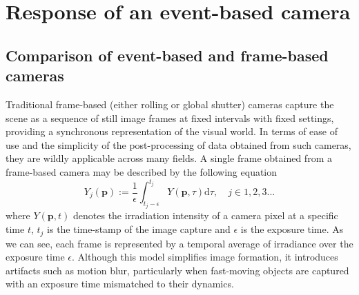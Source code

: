 
\chapter{Response of an event-based camera\label{chap:response}}

\section{Comparison of event-based and frame-based cameras}

Traditional frame-based (either rolling or global shutter) cameras capture the scene as a sequence of still image frames at fixed intervals with fixed settings, providing a synchronous representation of the visual world. 
In terms of ease of use and the simplicity of the post-processing of data obtained from such cameras, they are wildly applicable across many fields.
A single frame obtained from a frame-based camera may be described by the following equation ~\cite{scheerlinck2018event}
\begin{equation}
Y_j(\boldsymbol{p}) := \frac{1}{\epsilon} \int_{t_j - \epsilon}^{t_j} Y(\boldsymbol{p}, \tau) \mathrm{d} \tau, \quad j \in 1, 2, 3 ...
\label{eq:frame}
\end{equation}
where $Y(\boldsymbol{p}, t)$ denotes the irradiation intensity of a camera pixel at a specific time $t$, $t_j$ is the time-stamp of the image capture and $\epsilon$ is the exposure time.
As we can see, each frame is represented by a temporal average of irradiance over the exposure time $\epsilon$. Although this model simplifies image formation, it introduces artifacts such as motion blur, particularly when fast-moving objects are captured with an exposure time mismatched to their dynamics.

